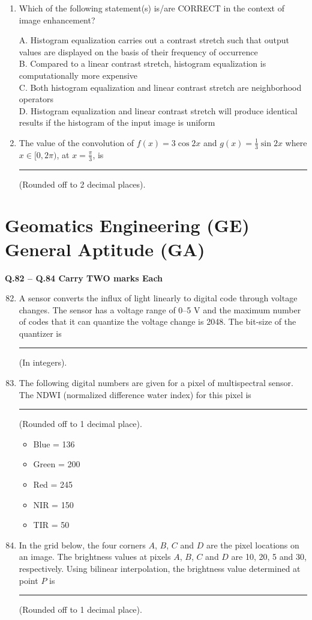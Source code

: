 \documentclass[journal,12pt,onecolumn]{IEEEtran}
\begin{document}
\begin{enumerate}
    \item Which of the following statement(s) is/are CORRECT in the context of image enhancement?

    A. Histogram equalization carries out a contrast stretch such that output values are displayed on the basis of their frequency of occurrence \\
    B. Compared to a linear contrast stretch, histogram equalization is computationally more expensive \\
    C. Both histogram equalization and linear contrast stretch are neighborhood operators \\
    D. Histogram equalization and linear contrast stretch will produce identical results if the histogram of the input image is uniform

    \item The value of the convolution of $f(x) = 3 \cos 2x$ and $g(x) = \frac{1}{3} \sin 2x$ where $x \in [0, 2\pi)$, at $x = \frac{\pi}{3}$, is \rule{3cm}{0.15mm} (Rounded off to 2 decimal places).
\end{enumerate}
\section*{Geomatics Engineering (GE) \\ General Aptitude (GA)}

\textbf{Q.82 -- Q.84 Carry TWO marks Each}

\begin{enumerate}
    \setcounter{enumi}{81}
    \item A sensor converts the influx of light linearly to digital code through voltage changes. The sensor has a voltage range of 0--5 V and the maximum number of codes that it can quantize the voltage change is 2048. The bit-size of the quantizer is \rule{3cm}{0.15mm} (In integers).

    \item The following digital numbers are given for a pixel of multispectral sensor. The NDWI (normalized difference water index) for this pixel is \rule{3cm}{0.15mm} (Rounded off to 1 decimal place).

    \begin{itemize}
        \item Blue = 136
        \item Green = 200
        \item Red = 245
        \item NIR = 150
        \item TIR = 50
    \end{itemize}

    \item In the grid below, the four corners $A$, $B$, $C$ and $D$ are the pixel locations on an image. The brightness values at pixels $A$, $B$, $C$ and $D$ are 10, 20, 5 and 30, respectively. Using bilinear interpolation, the brightness value determined at point $P$ is \rule{3cm}{0.15mm} (Rounded off to 1 decimal place).
\end{enumerate}
\end{document}
